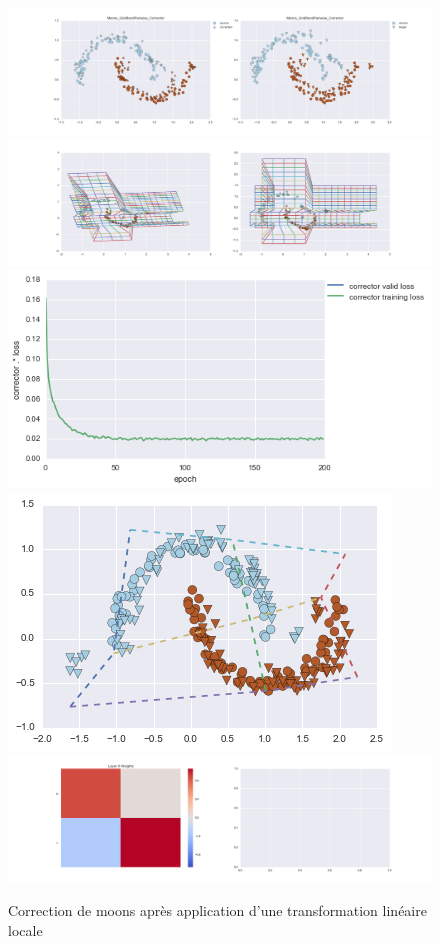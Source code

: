\begin{figure}[H] %
\centering
\includegraphics[width=\linewidth]{fig/24-05-2016/moons/Moons_GridBendPairwise_Corrector-DATA.png}
\includegraphics[width=\linewidth]{fig/24-05-2016/moons/Moons_GridBendPairwise_Corrector-GridCheck.png}
\includegraphics[width=0.45\linewidth]{fig/24-05-2016/moons/Moons_GridBendPairwise_Corrector-Learning_curve.png}
\includegraphics[width=0.45\linewidth]{fig/24-05-2016/moons/moons_grid.png}
\includegraphics[width=\linewidth]{fig/24-05-2016/moons/Moons_GridBendPairwise_Corrector-W.png}
\caption{Correction de moons après application d'une transformation linéaire locale}
\label{fig:recap-moons-GridBend-pairwise}
\end{figure}


